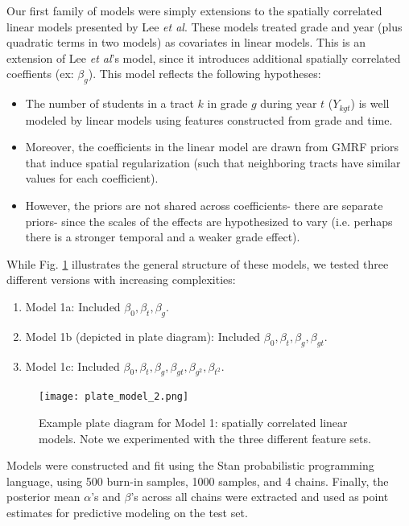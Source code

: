 \documentclass[journal]{IEEEtran}
\begin{document}
Our first family of models were simply extensions to the spatially correlated linear models presented by Lee \emph{et al}. These models treated grade and year (plus quadratic terms in two models) as covariates in linear models. This is an extension of Lee \emph{et al}'s model, since it introduces additional spatially correlated coeffients (ex: \(\beta_g\)). This model reflects the following hypotheses:
\begin{itemize}
    \item The number of students in a tract $k$ in grade $g$ during year $t$ ($Y_{kgt}$) is well modeled by linear models using features constructed from grade and time.
    \item Moreover, the coefficients in the linear model are drawn from GMRF priors that induce spatial regularization (such that neighboring tracts have similar values for each coefficient).
    \item However, the priors are not shared across coefficients- there are separate priors- since the scales of the effects are hypothesized to vary (i.e. perhaps there is a stronger temporal and a weaker grade effect).
\end{itemize}
While Fig. \ref{fig:plate_model_2} illustrates the general structure of these models, we tested three different versions with increasing complexities:
\begin{enumerate}
    \item  Model 1a: Included $\beta_0, \beta_t, \beta_g$.
    \item  Model 1b (depicted in plate diagram): Included $\beta_0, \beta_t, \beta_g, \beta_{gt}$.
    \item  Model 1c: Included $\beta_0, \beta_t, \beta_g, \beta_{gt}, \beta_{g^2}, \beta_{t^2}$.
\end{enumerate}

\begin{figure}[h!]
    \centering
    \texttt{[image: plate\_model\_2.png]}
    \caption{Example plate diagram for Model 1: spatially correlated linear models. Note we experimented with the three different feature sets.}
    \label{fig:plate_model_2}
\end{figure}

Models were constructed and fit using the Stan probabilistic programming language, using 500 burn-in samples, 1000 samples, and 4 chains. Finally, the posterior mean $\alpha$'s and $\beta$'s across all chains were extracted and used as point estimates for predictive modeling on the test set. \\
\end{document}
